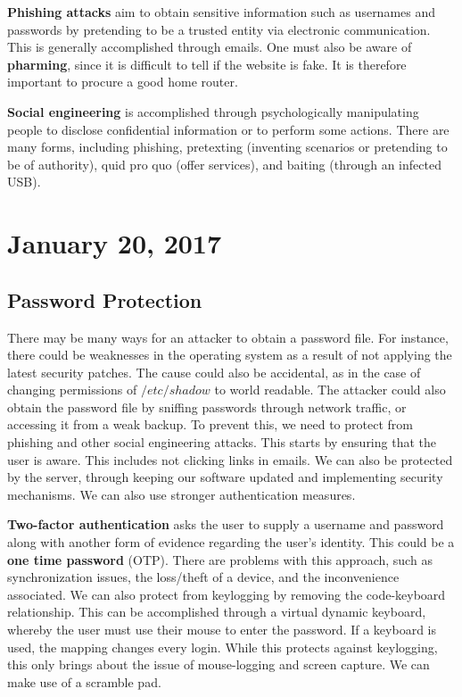 \documentclass[11pt]{article}
\theoremstyle{plain} %
\theoremstyle{definition}
\theoremstyle{example}
\theoremstyle{remark}
\begin{document}
\textbf{Phishing attacks} aim to obtain sensitive information such as usernames and passwords by pretending to be a trusted entity via electronic communication. This is generally accomplished through emails. One must also be aware of \textbf{pharming}, since it is difficult to tell if the website is fake. It is therefore important to procure a good home router. 

\textbf{Social engineering} is accomplished through psychologically manipulating people to disclose confidential information or to perform some actions. There are many forms, including phishing, pretexting (inventing scenarios or pretending to be of authority), quid pro quo (offer services), and baiting (through an infected USB).

\section{January 20, 2017}
\subsection{Password Protection}

There may be many ways for an attacker to obtain a password file. For instance, there could be weaknesses in the operating system as a result of not applying the latest security patches. The cause could also be accidental, as in the case of changing permissions of $/etc/shadow$ to world readable. The attacker could also obtain the password file by sniffing passwords through network traffic, or accessing it from a weak backup. To prevent this, we need to protect from phishing and other social engineering attacks. This starts by ensuring that the user is aware. This includes not clicking links in emails. We can also be protected by the server, through keeping our software updated and implementing security mechanisms. We can also use stronger authentication measures. 

\textbf{Two-factor authentication} asks the user to supply a username and password along with another form of evidence regarding the user's identity. This could be a \textbf{one time password} (OTP). There are problems with this approach, such as synchronization issues, the loss/theft of a device, and the inconvenience associated. We can also protect from keylogging by removing the code-keyboard relationship. This can be accomplished through a virtual dynamic keyboard, whereby the user must use their mouse to enter the password. If a keyboard is used, the mapping changes every login. While this protects against keylogging, this only brings about the issue of mouse-logging and screen capture. We can make use of a scramble pad.
\end{document}
